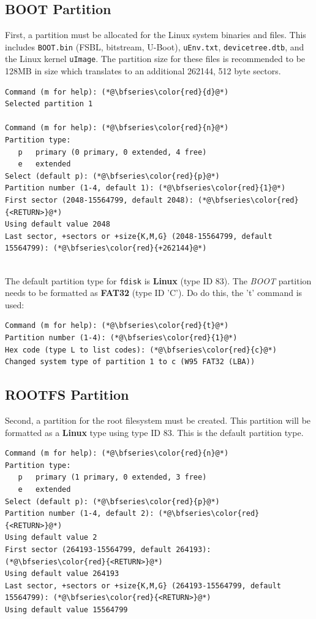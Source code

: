 \subsection{BOOT Partition}
First, a partition must be allocated for the Linux system binaries and files. This includes \texttt{BOOT.bin} (FSBL, bitstream, U-Boot), \texttt{uEnv.txt}, \texttt{devicetree.dtb}, and the Linux kernel \texttt{uImage}. The partition size for these files is recommended to be 128MB in size which translates to an additional 262144, 512 byte sectors. \\

\begin{lstlisting}[style=text]
Command (m for help): (*@\bfseries\color{red}{d}@*)
Selected partition 1

Command (m for help): (*@\bfseries\color{red}{n}@*)
Partition type:
   p   primary (0 primary, 0 extended, 4 free)
   e   extended
Select (default p): (*@\bfseries\color{red}{p}@*)
Partition number (1-4, default 1): (*@\bfseries\color{red}{1}@*)
First sector (2048-15564799, default 2048): (*@\bfseries\color{red}{<RETURN>}@*)
Using default value 2048
Last sector, +sectors or +size{K,M,G} (2048-15564799, default 15564799): (*@\bfseries\color{red}{+262144}@*)
\end{lstlisting}


~\\
\noindent
The default partition type for \texttt{fdisk} is \textbf{Linux} (type ID 83). The \textit{BOOT} partition needs to be formatted as \textbf{FAT32} (type ID 'C'). Do do this, the 't' command is used: \\

\begin{lstlisting}[style=text]
Command (m for help): (*@\bfseries\color{red}{t}@*)
Partition number (1-4): (*@\bfseries\color{red}{1}@*)
Hex code (type L to list codes): (*@\bfseries\color{red}{c}@*)
Changed system type of partition 1 to c (W95 FAT32 (LBA))
\end{lstlisting}

\subsection{ROOTFS Partition}
Second, a partition for the root filesystem must be created. This partition will be formatted as a \textbf{Linux} type using type ID 83. This is the default partition type. \\
\begin{lstlisting}[style=text]
Command (m for help): (*@\bfseries\color{red}{n}@*)
Partition type:
   p   primary (1 primary, 0 extended, 3 free)
   e   extended
Select (default p): (*@\bfseries\color{red}{p}@*)
Partition number (1-4, default 2): (*@\bfseries\color{red}{<RETURN>}@*)
Using default value 2
First sector (264193-15564799, default 264193): (*@\bfseries\color{red}{<RETURN>}@*)
Using default value 264193
Last sector, +sectors or +size{K,M,G} (264193-15564799, default 15564799): (*@\bfseries\color{red}{<RETURN>}@*)
Using default value 15564799
\end{lstlisting}

